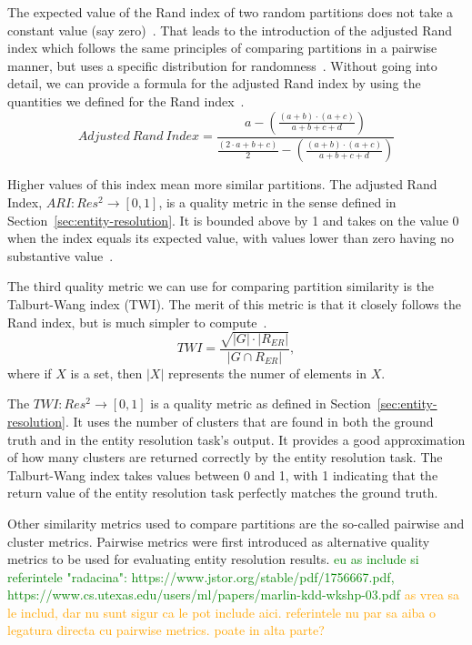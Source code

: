The expected value of the Rand index of two random partitions does not take
a constant value (say zero)~\cite{adjrand2001}.
That leads to the introduction of the adjusted Rand index which follows the
same principles of comparing partitions in a pairwise manner, but uses a
specific distribution for randomness~\cite{adjrand1985}.
Without going into detail, we can provide a formula for the adjusted Rand
index by using the quantities we defined for the Rand index~\cite{Tal11}.
\[
    Adjusted~Rand~Index = \frac{
        a -\left(\frac{(a+b)\cdot(a+c)}{a+b+c+d}\right)
    }{
        \frac{(2\cdot a+b+c)}{2}-\left(\frac{(a+b)\cdot(a+c)}{a+b+c+d}\right)
    }
\]

Higher values of this index mean more similar partitions.
The adjusted Rand Index, $ARI : Res^2 \rightarrow \left[0, 1\right]$, is a
quality metric in the sense defined in Section~\ref{sec:entity-resolution}.
It is bounded above by 1 and takes on the value 0 when the index equals its
expected value, with values lower than zero having no substantive
value~\cite{adjrand1985}.

The third quality metric we can use for comparing partition similarity is
the Talburt-Wang index (TWI).
The merit of this metric is that it closely follows the Rand index, but is
much simpler to compute~\cite{Tal11}.
\[
    TWI = \frac{\sqrt{|G|\cdot|R_{ER}|}}{|G \cap R_{ER}|},
\]
where if $X$ is a set, then $|X|$ represents the numer of elements in $X$. 

The $TWI: Res^2 \rightarrow \left[0, 1\right]$ is a quality metric as defined in
Section~\ref{sec:entity-resolution}.
It uses the number of clusters that are found in both the ground truth and in
the entity resolution task's output.
It provides a good approximation of how many clusters are returned correctly
by the entity resolution task.
The Talburt-Wang index takes values between 0 and 1, with 1 indicating that
the return value of the entity resolution task perfectly matches the ground
truth.

Other similarity metrics used to compare partitions are the so-called pairwise
and cluster metrics.
Pairwise metrics were first introduced as alternative quality metrics to be used
for evaluating entity resolution results\cite{Men10}.
\textcolor{green}{eu as include si referintele "radacina": https://www.jstor.org/stable/pdf/1756667.pdf, https://www.cs.utexas.edu/users/ml/papers/marlin-kdd-wkshp-03.pdf}
\textcolor{orange}{as vrea sa le includ, dar nu sunt sigur ca le pot include aici. referintele nu par sa aiba o legatura directa cu pairwise metrics. poate in alta parte?}

